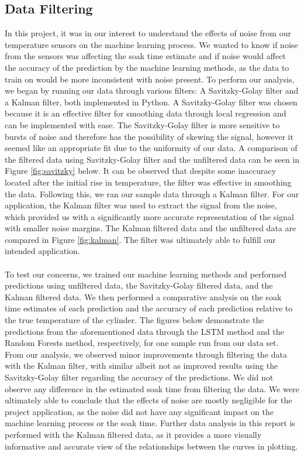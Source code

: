 \subsection{Data Filtering}
In this project, it was in our interest to understand the effects of noise from our temperature sensors on the machine learning process. We wanted to know if noise from the sensors was affecting the soak time estimate and if noise would affect the accuracy of the prediction by the machine learning methods, as the data to train on would be more inconsistent with noise present. To perform our analysis, we began by running our data through various filters: A Savitzky-Golay filter and a Kalman filter, both implemented in Python. A Savitzky-Golay filter was chosen because it is an effective filter for smoothing data through local regression and can be implemented with ease. The Savitzky-Golay filter is more sensitive to bursts of noise and therefore has the possibility of skewing the signal, however it seemed like an appropriate fit due to the uniformity of our data. A comparison of the filtered data using Savitzky-Golay filter and the unfiltered data can be seen in Figure \ref{fig:savitzky} below. It can be observed that despite some inaccuracy located after the initial rise in temperature, the filter was effective in smoothing the data. Following this, we ran our sample data through a Kalman filter. For our application, the Kalman filter was used to extract the signal from the noise, which provided us with a significantly more accurate representation of the signal with smaller noise margins. The Kalman filtered data and the unfiltered data are compared in Figure \ref{fig:kalman}. The filter was ultimately able to fulfill our intended application.\\\\
To test our concerns, we trained our machine learning methods and performed predictions using unfiltered data, the Savitzky-Golay filtered data, and the Kalman filtered data. We then performed a comparative analysis on the soak time estimates of each prediction and the accuracy of each prediction relative to the true temperature of the cylinder. The figures below demonstrate the predictions from the aforementioned data through the LSTM method and the Random Forests method, respectively, for one sample run from our data set. From our analysis, we observed minor improvements through filtering the data with the Kalman filter, with similar albeit not as improved results using the Savitzky-Golay filter regarding the accuracy of the predictions. We did not observe any difference in the estimated soak time from filtering the data. We were ultimately able to conclude that the effects of noise are mostly negligible for the project application, as the noise did not have any significant impact on the machine learning process or the soak time. Further data analysis in this report is performed with the Kalman filtered data, as it provides a more visually informative and accurate view of the relationships between the curves in plotting.

